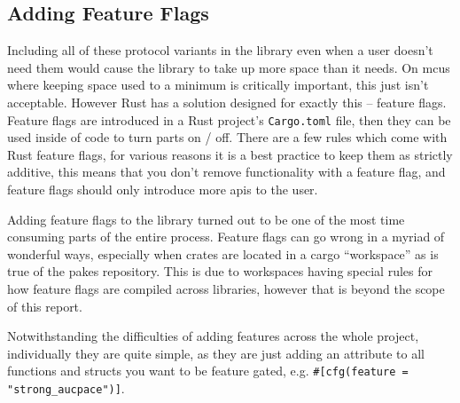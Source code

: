 \subsection{Adding Feature Flags}
Including all of these protocol variants in the library even when a user doesn't need them would cause the library to take up more space than it needs.
On \glspl{mcu} where keeping space used to a minimum is critically important, this just isn't acceptable.
However Rust has a solution designed for exactly this -- feature flags.
Feature flags are introduced in a Rust project's \texttt{Cargo.toml} file, then they can be used inside of code to turn parts on / off.
There are a few rules which come with Rust feature flags, for various reasons it is a best practice to keep them as strictly additive, this means that you don't remove functionality with a feature flag, and feature flags should only introduce more \glspl{api} to the user.

Adding feature flags to the library turned out to be one of the most time consuming parts of the entire process.
Feature flags can go wrong in a myriad of wonderful ways, especially when crates are located in a cargo \enquote{workspace} as is true of the \glspl{pake} repository.
This is due to workspaces having special rules for how feature flags are compiled across libraries, however that is beyond the scope of this report.

Notwithstanding the difficulties of adding features across the whole project, individually they are quite simple, as they are just adding an attribute to all functions and structs you want to be feature gated, e.g. \verb|#[cfg(feature = "strong_aucpace")]|.

